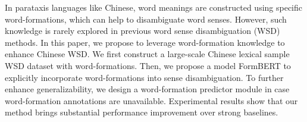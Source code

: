In parataxis languages like Chinese, word meanings are constructed using specific word-formations, which can help to disambiguate word senses. However, such knowledge is rarely explored in previous word sense disambiguation (WSD) methods. In this paper, we propose to leverage word-formation knowledge to enhance Chinese WSD. We first construct a large-scale Chinese lexical sample WSD dataset with word-formations. Then, we propose a model FormBERT to explicitly incorporate word-formations into sense disambiguation. To further enhance generalizability, we design a word-formation predictor module in case word-formation annotations are unavailable. Experimental results show that our method brings substantial performance improvement over strong baselines.
